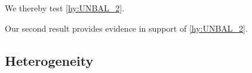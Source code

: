 \blindtext

\makeatletter
{}
\makeatother

\blindtext We thereby test \autoref{hy:UNBAL_2}.

\begin{result} \label{r:main2}
	\blindtext
\end{result}

Our second result provides evidence in support of \autoref{hy:UNBAL_2}.\blindmathfalse\blindtext\blindmathtrue

\subsection{Heterogeneity}
\blindmathpaper